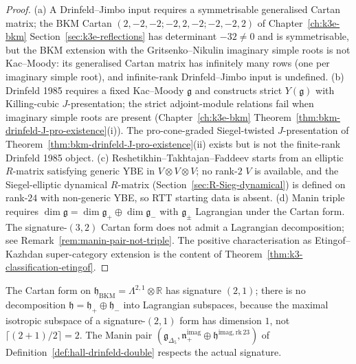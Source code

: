 \begin{proof}
(a) A Drinfeld--Jimbo input requires a symmetrisable generalised Cartan matrix; the
BKM Cartan $(2,-2,-2;-2,2,-2;-2,-2,2)$ of Chapter~\ref{ch:k3e-bkm} Section~\ref{sec:k3e-reflections}
has determinant $-32\neq 0$ and is symmetrisable, but the BKM extension with the
Gritsenko--Nikulin imaginary simple roots is not Kac--Moody: its generalised Cartan
matrix has infinitely many rows (one per imaginary simple root), and infinite-rank
Drinfeld--Jimbo input is undefined.
(b) Drinfeld 1985 requires a fixed Kac--Moody $\mathfrak{g}$ and constructs strict
$Y(\mathfrak{g})$ with Killing-cubic $J$-presentation; the strict adjoint-module
relations fail when imaginary simple roots are present
(Chapter~\ref{ch:k3e-bkm} Theorem~\ref{thm:bkm-drinfeld-J-pro-existence}(i)).
The pro-cone-graded Siegel-twisted $J$-presentation of
Theorem~\ref{thm:bkm-drinfeld-J-pro-existence}(ii) exists but is not the
finite-rank Drinfeld 1985 object.
(c) Reshetikhin--Takhtajan--Faddeev starts from an elliptic $R$-matrix satisfying
generic YBE in $V\otimes V\otimes V$; no rank-$2$ $V$ is available, and the
Siegel-elliptic dynamical $R$-matrix (Section~\ref{sec:R-Sieg-dynamical}) is defined
on rank-$24$ with non-generic YBE, so RTT starting data is absent.
(d) Manin triple requires $\dim\mathfrak{g}=\dim\mathfrak{g}_+\oplus\dim\mathfrak{g}_-$
with $\mathfrak{g}_\pm$ Lagrangian under the Cartan form. The signature-$(3,2)$
Cartan form does not admit a Lagrangian decomposition; see
Remark~\ref{rem:manin-pair-not-triple}.
The positive characterisation as Etingof--Kazhdan super-category extension is the
content of Theorem~\ref{thm:k3-classification-etingof}.
\end{proof}

\begin{remark}
\label{rem:manin-pair-not-triple}
The Cartan form on $\mathfrak{h}_{\mathrm{BKM}} = \Lambda^{2,1}\otimes\mathbb{R}$ has
signature $(2,1)$; there is no decomposition $\mathfrak{h}=\mathfrak{h}_+\oplus\mathfrak{h}_-$
into Lagrangian subspaces, because the maximal isotropic subspace of a signature-$(2,1)$
form has dimension $1$, not $\lceil(2+1)/2\rceil = 2$. The Manin pair
$(\mathfrak{g}_{\Delta_5}, \mathfrak{n}_+^{\mathrm{imag}}\oplus\mathfrak{h}^{\mathrm{imag,rk\,23}})$
of Definition~\ref{def:hall-drinfeld-double} respects the actual signature.
\end{remark}

